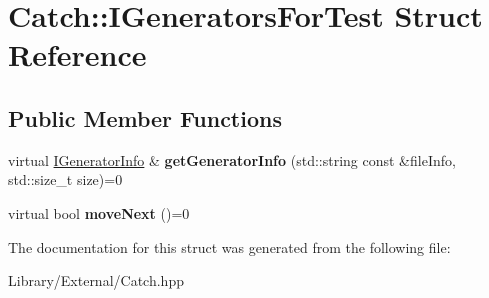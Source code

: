 \hypertarget{struct_catch_1_1_i_generators_for_test}{}\section{Catch\+:\+:I\+Generators\+For\+Test Struct Reference}
\label{struct_catch_1_1_i_generators_for_test}
\subsection*{Public Member Functions}
\begin{DoxyCompactItemize}
\item 
\hypertarget{struct_catch_1_1_i_generators_for_test_a180d84e858840188e4c3788e47eefdb0}{}virtual \hyperlink{struct_catch_1_1_i_generator_info}{I\+Generator\+Info} \& {\bfseries get\+Generator\+Info} (std\+::string const \&file\+Info, std\+::size\+\_\+t size)=0\label{struct_catch_1_1_i_generators_for_test_a180d84e858840188e4c3788e47eefdb0}

\item 
\hypertarget{struct_catch_1_1_i_generators_for_test_adab31832d529fc584fd63164e0a1c8ad}{}virtual bool {\bfseries move\+Next} ()=0\label{struct_catch_1_1_i_generators_for_test_adab31832d529fc584fd63164e0a1c8ad}

\end{DoxyCompactItemize}


The documentation for this struct was generated from the following file\+:\begin{DoxyCompactItemize}
\item 
Library/\+External/Catch.\+hpp\end{DoxyCompactItemize}
